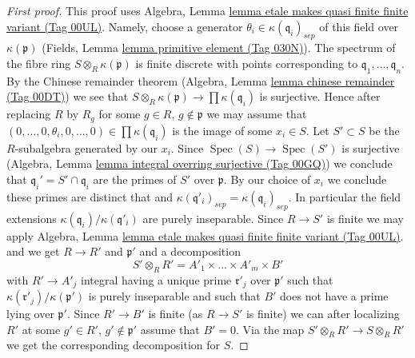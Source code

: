 \documentclass{amsart}
\theoremstyle{plain}
\theoremstyle{definition}
\theoremstyle{remark}
\numberwithin{equation}{subsection}
\def\Spec{\mathop{\mathrm{Spec}}}
\begin{document}
\begin{proof}[First proof]
This proof uses
Algebra, Lemma \href{https://stacks.math.columbia.edu/tag/00UL}{lemma etale makes quasi finite finite variant (Tag 00UL)}.
Namely, choose a generator $\theta_i \in \kappa(\mathfrak q_i)_{sep}$
of this field over $\kappa(\mathfrak p)$
(Fields, Lemma \href{https://stacks.math.columbia.edu/tag/030N}{lemma primitive element (Tag 030N)}).
The spectrum of the fibre ring $S \otimes_R \kappa(\mathfrak p)$
is finite discrete with points corresponding to
$\mathfrak q_1, \ldots, \mathfrak q_n$.
By the Chinese remainder theorem
(Algebra, Lemma \href{https://stacks.math.columbia.edu/tag/00DT}{lemma chinese remainder (Tag 00DT)})
we see that $S \otimes_R \kappa(\mathfrak p) \to \prod \kappa(\mathfrak q_i)$
is surjective. Hence after replacing $R$ by $R_g$ for some
$g \in R$, $g \not \in \mathfrak p$ we may assume that
$(0, \ldots, 0, \theta_i, 0, \ldots, 0) \in \prod \kappa(\mathfrak q_i)$
is the image of some $x_i \in S$.
Let $S' \subset S$ be the $R$-subalgebra generated by our $x_i$.
Since $\Spec(S) \to \Spec(S')$ is surjective
(Algebra, Lemma \href{https://stacks.math.columbia.edu/tag/00GQ}{lemma integral overring surjective (Tag 00GQ)})
we conclude that
$\mathfrak q_i' = S' \cap \mathfrak q_i$ are the primes of
$S'$ over $\mathfrak p$. By our choice of $x_i$ we conclude
these primes are distinct that and
$\kappa(\mathfrak q'_i)_{sep} = \kappa(\mathfrak q_i)_{sep}$.
In particular the field extensions
$\kappa(\mathfrak q_i)/\kappa(\mathfrak q'_i)$ are purely
inseparable.
Since $R \to S'$ is finite we may apply
Algebra, Lemma \href{https://stacks.math.columbia.edu/tag/00UL}{lemma etale makes quasi finite finite variant (Tag 00UL)}.
and we get $R \to R'$ and $\mathfrak p'$ and a decomposition
$$
S' \otimes_R R' = A'_1 \times \ldots \times A'_m \times B'
$$
with $R' \to A'_j$ integral having a unique prime
$\mathfrak r'_j$ over $\mathfrak p'$ such that
$\kappa(\mathfrak r'_j)/\kappa(\mathfrak p')$
is purely inseparable and such that $B'$ does not have a prime
lying over $\mathfrak p'$. Since $R' \to B'$ is finite
(as $R \to S'$ is finite) we can
after localizing $R'$ at some $g' \in R'$, $g' \not \in \mathfrak p'$
assume that $B' = 0$. Via the map $S' \otimes_R R' \to S \otimes_R R'$
we get the corresponding decomposition for $S$.
\end{proof}
\end{document}
